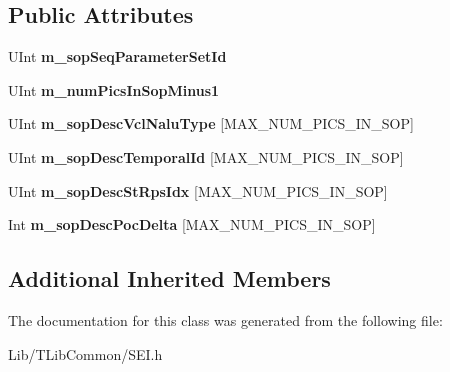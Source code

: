 \subsection*{Public Attributes}
\begin{DoxyCompactItemize}
\item 
\mbox{\label{class_s_e_i_s_o_p_description_a98526fdf5e0ed5e81958e01b7c32bb2f}} 
U\+Int {\bfseries m\+\_\+sop\+Seq\+Parameter\+Set\+Id}
\item 
\mbox{\label{class_s_e_i_s_o_p_description_abda52b9e6a3ed9b5f05954a2f29fc4f6}} 
U\+Int {\bfseries m\+\_\+num\+Pics\+In\+Sop\+Minus1}
\item 
\mbox{\label{class_s_e_i_s_o_p_description_a234b63621bff8b70a4e69b7ac96ade35}} 
U\+Int {\bfseries m\+\_\+sop\+Desc\+Vcl\+Nalu\+Type} \mbox{[}M\+A\+X\+\_\+\+N\+U\+M\+\_\+\+P\+I\+C\+S\+\_\+\+I\+N\+\_\+\+S\+OP\mbox{]}
\item 
\mbox{\label{class_s_e_i_s_o_p_description_afbf452157c54de0eb6501a482661cd81}} 
U\+Int {\bfseries m\+\_\+sop\+Desc\+Temporal\+Id} \mbox{[}M\+A\+X\+\_\+\+N\+U\+M\+\_\+\+P\+I\+C\+S\+\_\+\+I\+N\+\_\+\+S\+OP\mbox{]}
\item 
\mbox{\label{class_s_e_i_s_o_p_description_a7f272a2c95890acabd704c6977c3942d}} 
U\+Int {\bfseries m\+\_\+sop\+Desc\+St\+Rps\+Idx} \mbox{[}M\+A\+X\+\_\+\+N\+U\+M\+\_\+\+P\+I\+C\+S\+\_\+\+I\+N\+\_\+\+S\+OP\mbox{]}
\item 
\mbox{\label{class_s_e_i_s_o_p_description_ae85f54a09897515571854f16c0a89cd4}} 
Int {\bfseries m\+\_\+sop\+Desc\+Poc\+Delta} \mbox{[}M\+A\+X\+\_\+\+N\+U\+M\+\_\+\+P\+I\+C\+S\+\_\+\+I\+N\+\_\+\+S\+OP\mbox{]}
\end{DoxyCompactItemize}
\subsection*{Additional Inherited Members}


The documentation for this class was generated from the following file\+:\begin{DoxyCompactItemize}
\item 
Lib/\+T\+Lib\+Common/S\+E\+I.\+h\end{DoxyCompactItemize}
